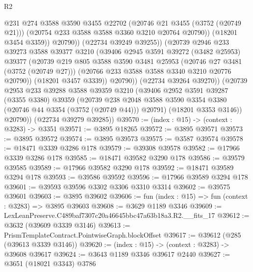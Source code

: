 \begin{lexlean}{R2}
\begin{coremodule}
                      @231
                      @274
                      @3588
                      @3590
                      @3455
                      @22702
                      (@20746 @21 @3455 (@3752 (@20749 @21)))
                      (@20754 @233 @3588 @3588 @3360 @3210 @20764 @20790))
                    (@18201 @3454 @3359))
                  @20790))
              (@22734 @39249 @39255))
            (@20739
              @2946
              @233
              @39273
              @3588
              @39377
              @3210
              (@39406
                @2945
                @3591
                @39272
                (@3482 @25953)
                @39377
                (@20739
                  @219
                  @805
                  @3588
                  @3590
                  @3481
                  @25953
                  (@20746 @27 @3481 (@3752 (@20749 @27)))
                  (@20766 @233 @3588 @3588 @3340 @3210 @20776 @20790))
                (@18201 @3457 @3339))
              @20790))
          (@22734 @39264 @39270))
        (@20739
          @2953
          @233
          @39288
          @3588
          @39359
          @3210
          (@39406
            @2952
            @3591
            @39287
            (@3355 @3380)
            @39359
            (@20739
              @238
              @2048
              @3588
              @3590
              @3354
              @3380
              (@20746 @44 @3354 (@3752 (@20749 @44)))
              @20791)
            (@18201 @3353 @3146))
          @20790))
      (@22734 @39279 @39285))
@39570 := (index : @15) -> (context : @3283) -> @3351
@39571 := @3895 @18265
@39572 := @3895 @39571
@39573 := @3895 @39572
@39574 := @3895 @39573
@39575 := @3587 @39574
@39578 := @18471 @3339 @3286 @178
@39579 := @39308 @39578
@39582 := @17966 @3339 @3286 @178
@39585 := @18471 @39582 @3290 @178
@39586 := @39579 @39585
@39589 := @17966 @39582 @3290 @178
@39592 := @18471 @39589 @3294 @178
@39593 := @39586 @39592
@39596 := @17966 @39589 @3294 @178
@39601 := @39593 @39596 @3302 @3306 @3310 @3314
@39602 := @39575 @39601
@39603 := @3895 @39602
@39606 := fun (index : @15) => fun (context : @3283) => @3895 @39603
@39608 := @3629 @1189 @3346
@39609 := LexLeanPreserve.C489baf7307c20a46645bbc47a63b18a3.R2.__fits_17
@39612 := @3632 (@39609 @3339 @3146)
@39613 := PrismTemplateContract.PointwiseGraph.blockOffset
@39617 := @39612 (@285 (@39613 @3339 @3146))
@39620 := (index : @15) -> (context : @3283) -> @39608 @39617
@39624 := @3643 @1189 @3346 @39617 @2440
@39627 := @3651 (@18021 @3343) @3786

\end{coremodule}
\end{lexlean}

